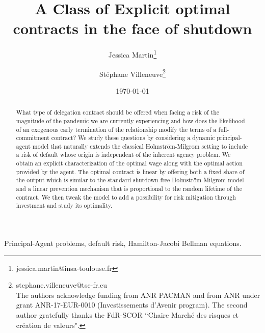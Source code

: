 \documentclass[numbook, envcountsect, envcountsame, envcountreset, runningheads, smallextended]{article}
\begin{document}
\title{A Class of Explicit optimal contracts in the face of shutdown}

\author[1]{Jessica Martin\footnote{jessica.martin@insa-toulouse.fr}}

\author[2]{Stéphane Villeneuve\footnote{stephane.villeneuve@tse-fr.eu\\ The authors acknowledge funding from ANR PACMAN and from ANR under grant ANR-17-EUR-0010 (Investissements d'Avenir program). The second author gratefully thanks the  FdR-SCOR ``Chaire March\'e des risques et cr\'eation de valeurs".}}



\date{\today}
\maketitle
\begin{abstract}
What type of delegation contract should be offered when facing a  risk of the magnitude of the pandemic we are currently experiencing and how does the likelihood of an exogenous early termination of the relationship modify the terms of a full-commitment contract? We study these questions by considering a dynamic principal-agent model that naturally  extends the classical Holmström-Milgrom setting to include a  risk of default whose origin is independent of the inherent agency problem. We obtain an explicit characterization of the optimal wage along with the optimal action provided by the agent. The optimal contract is linear by offering both a fixed share of the output which is similar to the standard shutdown-free Holmström-Milgrom model and a linear prevention mechanism that is proportional to the random lifetime of the contract.  We then tweak the model to add a possibility for risk mitigation through investment and study its optimality. 
\end{abstract}

\begin{keywords}
Principal-Agent problems, default risk, Hamilton-Jacobi Bellman equations.
\end{keywords}
\end{document}
